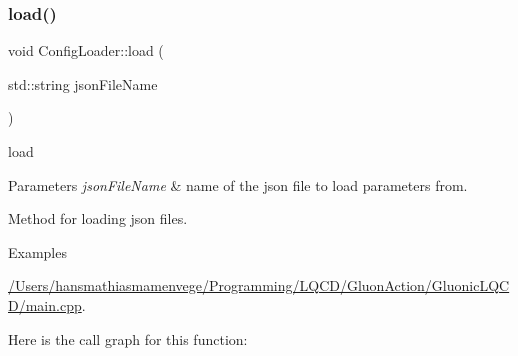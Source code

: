\subsubsection{\texorpdfstring{load()}{load()}}
{\footnotesize\ttfamily void Config\+Loader\+::load (\begin{DoxyParamCaption}\item[{std\+::string}]{json\+File\+Name }\end{DoxyParamCaption})}



load 


\begin{DoxyParams}{Parameters}
{\em json\+File\+Name} & name of the json file to load parameters from.\\
\hline
\end{DoxyParams}
Method for loading json files. \begin{Desc}
\item[Examples]\par
\mbox{\hyperlink{_2_users_2hansmathiasmamenvege_2_programming_2_l_q_c_d_2_gluon_action_2_gluonic_l_q_c_d_2main_8cpp-example}{/\+Users/hansmathiasmamenvege/\+Programming/\+L\+Q\+C\+D/\+Gluon\+Action/\+Gluonic\+L\+Q\+C\+D/main.\+cpp}}.\end{Desc}
Here is the call graph for this function\+:
\nopagebreak
